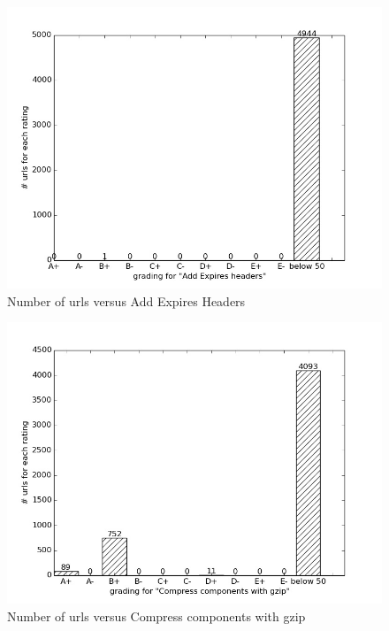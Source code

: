 \documentclass[conference]{IEEEtran}
\begin{document}
\begin{figure}[ht]
 \centering
  \includegraphics[scale=0.33]{new-img-jpg/vlab-jpg/Add Expires headers.jpg}
\caption{Number of urls versus Add Expires Headers}	
\label{fig:add-eh}
\end{figure}

\begin{figure}[ht]
 \centering
  \includegraphics[scale=0.33]{new-img-jpg/vlab-jpg/Compress components with gzip.jpg}
\caption{Number of urls versus Compress components with gzip}	
\label{fig:ccg}
\end{figure}
\end{document}
